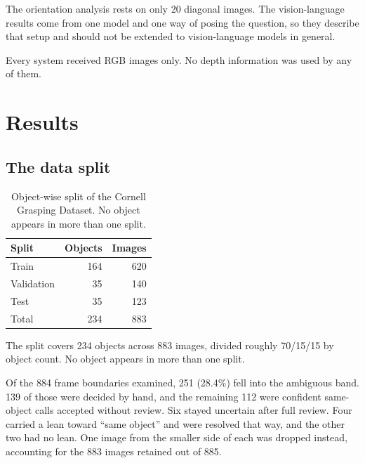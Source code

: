 \documentclass[12pt,letterpaper]{article}
\begin{document}
The orientation analysis rests on only 20 diagonal images. The
vision-language results come from one model and one way of posing the
question, so they describe that setup and should not be extended to
vision-language models in general.

Every system received RGB images only. No depth information was used
by any of them.

\section{Results}

\subsection{The data split}

\begin{table}[H]
\centering
\caption{Object-wise split of the Cornell Grasping Dataset. No object
appears in more than one split.}
\label{tab:split}
\begin{tabular}{lrr}
\toprule
Split & Objects & Images \\
\midrule
Train      & 164 & 620 \\
Validation &  35 & 140 \\
Test       &  35 & 123 \\
\midrule
Total      & 234 & 883 \\
\bottomrule
\end{tabular}
\end{table}

The split covers 234 objects across 883 images, divided roughly 70/15/15
by object count. No object appears in more than one split.

Of the 884 frame boundaries examined, 251 (28.4\%) fell into the
ambiguous band. 139 of those were decided by hand, and the remaining
112 were confident same-object calls accepted without review. Six
stayed uncertain after full review. Four carried a lean
toward ``same object'' and were resolved that way, and the other two had
no lean. One image from the smaller side of each was dropped instead,
accounting for the 883 images retained out of 885.
\end{document}
